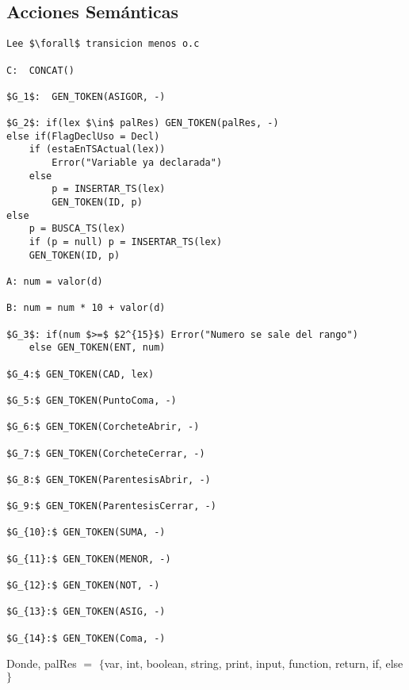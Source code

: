 \documentclass[a4paper, 12pt]{article}
\begin{document}
\newpage
\subsection{Acciones Semánticas}
\lstset{
  basicstyle=\mdseries,
  xleftmargin=3em,
  mathescape=true
}

\begin{lstlisting}
Lee $\forall$ transicion menos o.c

C:  CONCAT()

$G_1$:  GEN_TOKEN(ASIGOR, -)

$G_2$: if(lex $\in$ palRes) GEN_TOKEN(palRes, -)
else if(FlagDeclUso = Decl)
	if (estaEnTSActual(lex)) 
		Error("Variable ya declarada")
	else 
		p = INSERTAR_TS(lex)
		GEN_TOKEN(ID, p)
else 
	p = BUSCA_TS(lex)
	if (p = null) p = INSERTAR_TS(lex)
	GEN_TOKEN(ID, p)

A: num = valor(d)

B: num = num * 10 + valor(d)

$G_3$: if(num $>=$ $2^{15}$) Error("Numero se sale del rango")
    else GEN_TOKEN(ENT, num)

$G_4:$ GEN_TOKEN(CAD, lex)

$G_5:$ GEN_TOKEN(PuntoComa, -)

$G_6:$ GEN_TOKEN(CorcheteAbrir, -)

$G_7:$ GEN_TOKEN(CorcheteCerrar, -)

$G_8:$ GEN_TOKEN(ParentesisAbrir, -)

$G_9:$ GEN_TOKEN(ParentesisCerrar, -)

$G_{10}:$ GEN_TOKEN(SUMA, -)

$G_{11}:$ GEN_TOKEN(MENOR, -)

$G_{12}:$ GEN_TOKEN(NOT, -)

$G_{13}:$ GEN_TOKEN(ASIG, -)

$G_{14}:$ GEN_TOKEN(Coma, -)	
\end{lstlisting}
Donde, palRes $=$ $\{$var, int, boolean, string, print, input, function, return, if, else$\}$
\newline
\end{document}

